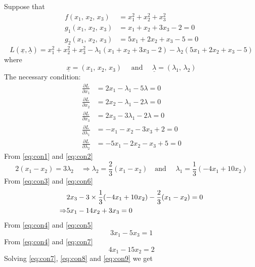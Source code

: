 \documentclass[../main-sheet.tex]{subfiles}
\begin{document}
    \begin{soln}
        Suppose that
        \begin{align*}
            f(x_1,\,x_2,\,x_3)&=x_1^2+x_2^2+x_3^2\\
            g_1(x_1,\,x_2,\,x_3)&=x_1+x_2+3x_3-2=0\\
            g_2(x_1,\,x_2,\,x_3)&=5x_1+2x_2+x_3-5=0
        \end{align*}
        \[
            L(\underline{x},\underline{\lambda})=x_1^2+x_2^2+x_3^2-\lambda_1(x_1+x_2+3x_3-2)-\lambda_2(5x_1+2x_2+x_3-5)
        \]
        where
        \[
            \underline{x}=(x_1,\,x_2,\,x_3)\quad \text{ and }\quad \underline{\lambda}=(\lambda_1,\,\lambda_2)
        \]
        The necessary condition:
        \begin{align}
            \frac{\partial L}{\partial x_1}&=2x_1-\lambda_1-5\lambda=0\label{eq:con1}\\
            \frac{\partial L}{\partial x_2}&=2x_2-\lambda_1-2\lambda=0\label{eq:con2}\\
            \frac{\partial L}{\partial x_3}&=2x_3-3\lambda_1-2\lambda=0\label{eq:con3}\\
            \frac{\partial L}{\partial \lambda_1}&=-x_1-x_2-3x_3+2=0\label{eq:con4}\\
            \frac{\partial L}{\partial \lambda_2}&=-5x_1-2x_2-x_3+5=0\label{eq:con5}
        \end{align}
        From \eqref{eq:con1} and \eqref{eq:con2}
        \begin{equation}
            2(x_1-x_2)=3\lambda_2\quad \Rightarrow \lambda_2=\frac{2}{3}(x_1-x_2) \quad \text{and }\quad \lambda_1=\frac{1}{3}(-4x_1+10x_2) \label{eq:con6}
        \end{equation}
        From \eqref{eq:con3} and \eqref{eq:con6}
        \begin{align}
            &2x_3-3\times\frac{1}{3}(-4x_1+10x_2)-\frac{2}{3}(x_1-x_2)=0\notag\\
            \Rightarrow&5x_1-14x_2+3x_3=0 \label{eq:con7}
        \end{align}
        From \eqref{eq:con4} and \eqref{eq:con5}
        \begin{equation}
            3x_1-5x_3=1 \label{eq:con8}
        \end{equation}
        From \eqref{eq:con4} and \eqref{eq:con7}
        \begin{equation}
            4x_1-15x_2=2 \label{eq:con9}
        \end{equation}
        Solving \eqref{eq:con7}, \eqref{eq:con8} and \eqref{eq:con9} we get

\end{soln}
\end{document}
